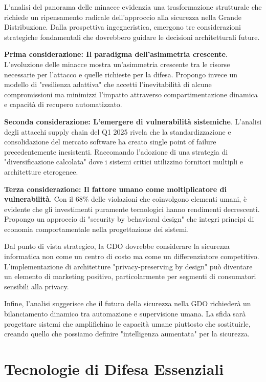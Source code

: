 \documentclass[12pt,a4paper,oneside]{book}
\begin{document}
L'analisi del panorama delle minacce evidenzia una trasformazione strutturale che richiede un ripensamento radicale dell'approccio alla sicurezza nella Grande Distribuzione. Dalla prospettiva ingegneristica, emergono tre considerazioni strategiche fondamentali che dovrebbero guidare le decisioni architetturali future.

\textbf{Prima considerazione: Il paradigma dell'asimmetria crescente}. L'evoluzione delle minacce mostra un'asimmetria crescente tra le risorse necessarie per l'attacco e quelle richieste per la difesa. Propongo invece un modello di "resilienza adattiva" che accetti l'inevitabilità di alcune compromissioni ma minimizzi l'impatto attraverso compartimentazione dinamica e capacità di recupero automatizzato.

\textbf{Seconda considerazione: L'emergere di vulnerabilità sistemiche}. L'analisi degli attacchi supply chain del Q1 2025 rivela che la standardizzazione e consolidazione del mercato software ha creato single point of failure precedentemente inesistenti. Raccomando l'adozione di una strategia di "diversificazione calcolata" dove i sistemi critici utilizzino fornitori multipli e architetture eterogenee.

\textbf{Terza considerazione: Il fattore umano come moltiplicatore di vulnerabilità}. Con il 68\% delle violazioni che coinvolgono elementi umani, è evidente che gli investimenti puramente tecnologici hanno rendimenti decrescenti. Propongo un approccio di "security by behavioral design" che integri principi di economia comportamentale nella progettazione dei sistemi.

Dal punto di vista strategico, la GDO dovrebbe considerare la sicurezza informatica non come un centro di costo ma come un differenziatore competitivo. L'implementazione di architetture "privacy-preserving by design" può diventare un elemento di marketing positivo, particolarmente per segmenti di consumatori sensibili alla privacy.

Infine, l'analisi suggerisce che il futuro della sicurezza nella GDO richiederà un bilanciamento dinamico tra automazione e supervisione umana. La sfida sarà progettare sistemi che amplifichino le capacità umane piuttosto che sostituirle, creando quello che possiamo definire "intelligenza aumentata" per la sicurezza.

\section{Tecnologie di Difesa Essenziali}
\end{document}
